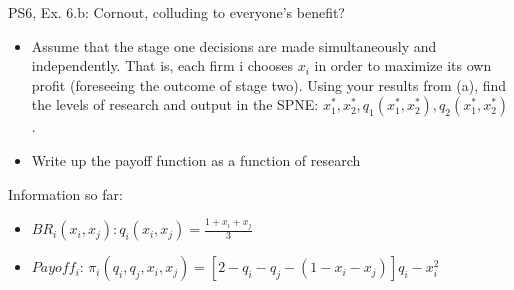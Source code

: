 \begin{frame}{PS6, Ex. 6.b: Cornout, colluding to everyone's benefit?}
    \begin{itemize}
    \item[(b)] Assume that the stage one decisions are made simultaneously and independently. That is, each firm i chooses $x_i$ in order to maximize its own profit (foreseeing the outcome of stage two). Using your results from (a), find the levels of research and output in the SPNE: $x_1^*,x_2^*,q_1(x_1^*,x_2^*),q_2(x_1^*,x_2^*)$.
    \end{itemize}
    \vfill\null
  \begin{multicols}{2}
    \begin{itemize}
      \item[(Step 1)] Write up the payoff function as a function of research
    \end{itemize}
    \vfill\null \columnbreak
    Information so far:
    \begin{itemize}
    \item[1] $BR_i(x_i,x_j): q_i(x_i,x_j)=\frac{1+x_i+x_j}{3}$
    \item[2] $Payoff_i$: $\pi_i(q_i,q_j,x_i,x_j) = [2-q_i-q_j-(1-x_i-x_j)]q_i-x_i^2$
    \end{itemize}
    \vfill\null
  \end{multicols}
\end{frame}

